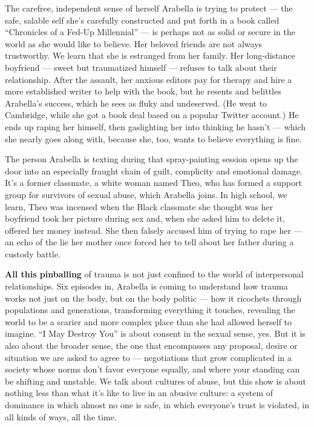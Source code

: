 The carefree, independent sense of herself Arabella is trying to protect
--- the safe, salable self she's carefully constructed and put forth in
a book called ``Chronicles of a Fed-Up Millennial'' --- is perhaps not
as solid or secure in the world as she would like to believe. Her
beloved friends are not always trustworthy. We learn that she is
estranged from her family. Her long-distance boyfriend --- sweet but
traumatized himself --- refuses to talk about their relationship. After
the assault, her anxious editors pay for therapy and hire a more
established writer to help with the book, but he resents and belittles
Arabella's success, which he sees as fluky and undeserved. (He went to
Cambridge, while she got a book deal based on a popular Twitter
account.) He ends up raping her himself, then gaslighting her into
thinking he hasn't --- which she nearly goes along with, because she,
too, wants to believe everything is fine.

The person Arabella is texting during that spray-painting session opens
up the door into an especially fraught chain of guilt, complicity and
emotional damage. It's a former classmate, a white woman named Theo, who
has formed a support group for survivors of sexual abuse, which Arabella
joins. In high school, we learn, Theo was incensed when the Black
classmate she thought was her boyfriend took her picture during sex and,
when she asked him to delete it, offered her money instead. She then
falsely accused him of trying to rape her --- an echo of the lie her
mother once forced her to tell about her father during a custody battle.

\textbf{All this pinballing} of trauma is not just confined to the world
of interpersonal relationships. Six episodes in, Arabella is coming to
understand how trauma works not just on the body, but on the body
politic --- how it ricochets through populations and generations,
transforming everything it touches, revealing the world to be a scarier
and more complex place than she had allowed herself to imagine. ``I May
Destroy You'' is about consent in the sexual sense, yes. But it is also
about the broader sense, the one that encompasses any proposal, desire
or situation we are asked to agree to --- negotiations that grow
complicated in a society whose norms don't favor everyone equally, and
where your standing can be shifting and unstable. We talk about cultures
of abuse, but this show is about nothing less than what it's like to
live in an abusive culture: a system of dominance in which almost no one
is safe, in which everyone's trust is violated, in all kinds of ways,
all the time.


